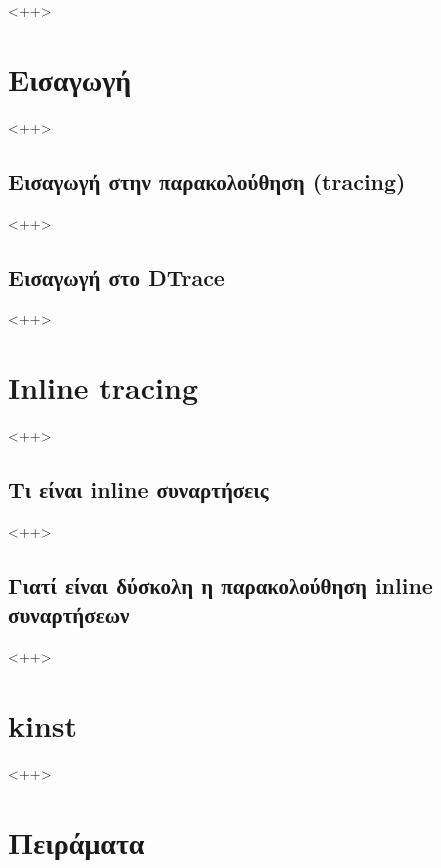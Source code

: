 \documentclass[12pt]{article}
\begin{document}
<++>

\section{Εισαγωγή}

<++>

\subsection{Εισαγωγή στην παρακολούθηση (tracing)}

<++>

\subsection{Εισαγωγή στο DTrace}


<++>

\section{Inline tracing}


<++>

\subsection{Τι είναι inline συναρτήσεις}

<++>

\subsection{Γιατί είναι δύσκολη η παρακολούθηση inline συναρτήσεων}


<++>

\section{kinst}


<++>

\section{Πειράματα}
\end{document}
